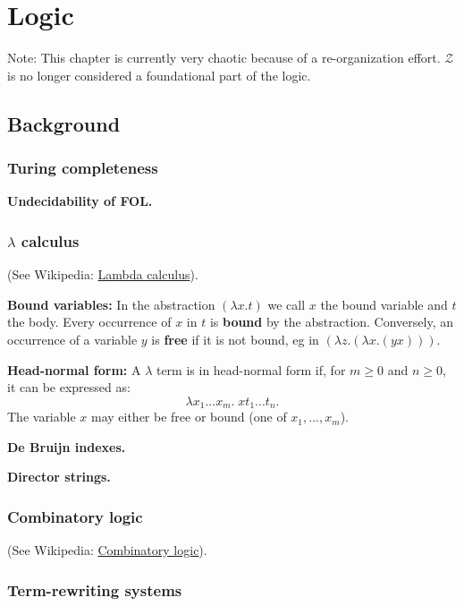 \chapter{Logic}
\minitoc

Note:  This chapter is currently very chaotic because of a re-organization effort.  $\mathcal{Z}$ is no longer considered a foundational part of the logic.

\section{Background}

\subsection{Turing completeness}

\textbf{Undecidability of FOL.}

\subsection{$\lambda$ calculus}

(See Wikipedia: \href{http://en.wikipedia.org/wiki/Lambda_calculus}{Lambda calculus}).

\textbf{Bound variables:}  In the abstraction $(\lambda x.t)$ we call $x$ the bound variable and $t$ the body.  Every occurrence of $x$ in $t$ is \textbf{bound} by the abstraction.  Conversely, an occurrence of a variable $y$ is \textbf{free} if it is not bound, eg in $(\lambda z.(\lambda x.(yx)))$.

\textbf{Head-normal form:}  A $\lambda$ term is in head-normal form if, for $m \geq 0$ and $n \geq 0$, it can be expressed as:
$$\lambda x_1 ... x_m . \; x t_1 ... t_n.$$
The variable $x$ may either be free or bound (one of $x_1,...,x_m$).

\textbf{De Bruijn indexes.}

\textbf{Director strings.}

\subsection{Combinatory logic}

(See Wikipedia: \href{http://en.wikipedia.org/wiki/Combinatory_logic}{Combinatory logic}).

\subsection{Term-rewriting systems}

